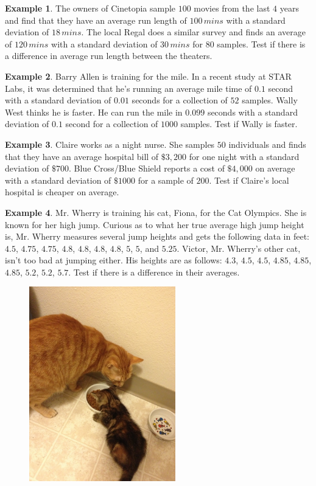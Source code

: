 \documentclass[12pt]{amsart}
\theoremstyle{definition}
\newtheorem{ex}{Example}
\begin{document}
\begin{ex}
	The owners of Cinetopia sample $100$ movies from the last $4$ years and find that they have an average run length of $100\,mins$ with a standard deviation of $18\,mins$. The local Regal does a similar survey and finds an average of $120\,mins$ with a standard deviation of $30\,mins$ for $80$ samples. Test if there is a difference in average run length between the theaters.
\end{ex}

\begin{ex}
	Barry Allen is training for the mile. In a recent study at STAR Labs, it was determined that he's running an average mile time of $0.1$ second with a standard deviation of $0.01$ seconds for a collection of $52$ samples. Wally West thinks he is faster. He can run the mile in $0.099$ seconds with a standard deviation of $0.1$ second for a collection of $1000$ samples. Test if Wally is faster.
\end{ex}

\begin{ex}
	Claire works as a night nurse. She samples $50$ individuals and finds that they have an average hospital bill of $\$3,200$ for one night with a standard deviation of $\$700$. Blue Cross/Blue Shield reports a cost of $\$4,000$ on average with a standard deviation of $\$1000$ for a sample of $200$. Test if Claire's local hospital is cheaper on average. 
\end{ex}

\begin{ex}
	Mr. Wherry is training his cat, Fiona, for the Cat Olympics. She is known for her high jump. Curious as to what her true average high jump height is, Mr. Wherry measures several jump heights and gets the following data in feet: $4.5$, $4.75$, $4.75$, $4.8$, $4.8$, $4.8$, $4.8$, $5$, $5$, and $5.25$. Victor, Mr. Wherry's other cat, isn't too bad at jumping either. His heights are as follows: $4.3$, $4.5$, $4.5$, $4.85$, $4.85$, $4.85$, $5.2$, $5.2$, $5.7$. Test if there is a difference in their averages.
\end{ex}

\begin{figure}[h]
 \centering
 \includegraphics[width=2.5in,keepaspectratio=true]{./IMG_0886.JPG}
 \label{fig: Victor}
\end{figure}
\end{document}

